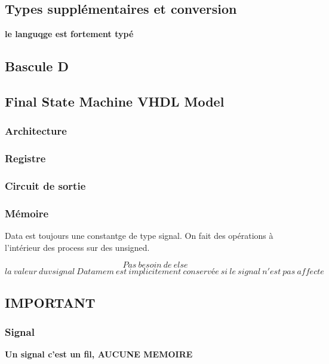 \subsection{Types supplémentaires et conversion}
\textbf{le languqge est fortement typé}



\subsection{Bascule D}


\subsection{Final State Machine VHDL Model}
\subsubsection{Architecture}
\subsubsection{Registre}

\subsubsection{Circuit de sortie}

\subsubsection{Mémoire}
Data est toujours une constantge de type signal. On fait des opérations à l'intérieur des process sur des unsigned.

$$Pas~ besoin~ de~ else$$
$$la ~valeur~ du vsignal~ Datamem~ est~ implicitement~ conservée~ si~ le~ signal~ n'est ~pas~ affecte$$




\newpage
\subsection{IMPORTANT}
\subsubsection{Signal}
\textbf{Un signal c'est un fil, AUCUNE MEMOIRE}

